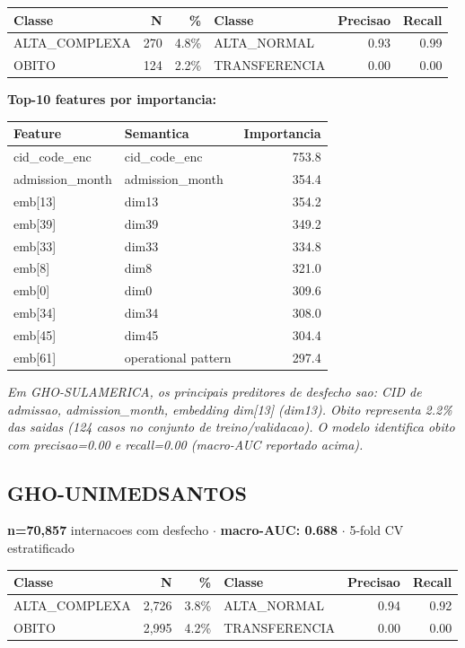 \documentclass[11pt,a4paper]{article}
\begin{document}
\begin{tabular}{lrr|lrr}
\toprule
Classe & N & \% & Classe & Precisao & Recall \\
\midrule
ALTA\_COMPLEXA & 270 & 4.8\% & ALTA\_NORMAL & 0.93 & 0.99 \\
OBITO & 124 & 2.2\% & TRANSFERENCIA & 0.00 & 0.00 \\
\bottomrule
\end{tabular}

\vspace{4pt}\noindent\textbf{Top-10 features por importancia:}

\begin{tabular}{llr}
\toprule
Feature & Semantica & Importancia \\
\midrule
cid\_code\_enc & cid\_code\_enc & 753.8 \\
admission\_month & admission\_month & 354.4 \\
emb[13] & dim13 & 354.2 \\
emb[39] & dim39 & 349.2 \\
emb[33] & dim33 & 334.8 \\
emb[8] & dim8 & 321.0 \\
emb[0] & dim0 & 309.6 \\
emb[34] & dim34 & 308.0 \\
emb[45] & dim45 & 304.4 \\
emb[61] & operational pattern & 297.4 \\
\bottomrule
\end{tabular}

\vspace{4pt}\noindent\textit{Em GHO-SULAMERICA, os principais preditores de desfecho sao: CID de admissao, admission\_month, embedding dim[13] (dim13). Obito representa 2.2\% das saidas (124 casos no conjunto de treino/validacao). O modelo identifica obito com precisao=0.00 e recall=0.00 (macro-AUC reportado acima).}

\subsection{GHO-UNIMEDSANTOS}
\textbf{n=70,857} internacoes com desfecho $\cdot$ \textbf{macro-AUC: 0.688} $\cdot$ 5-fold CV estratificado

\begin{tabular}{lrr|lrr}
\toprule
Classe & N & \% & Classe & Precisao & Recall \\
\midrule
ALTA\_COMPLEXA & 2,726 & 3.8\% & ALTA\_NORMAL & 0.94 & 0.92 \\
OBITO & 2,995 & 4.2\% & TRANSFERENCIA & 0.00 & 0.00 \\
\bottomrule
\end{tabular}
\end{document}
